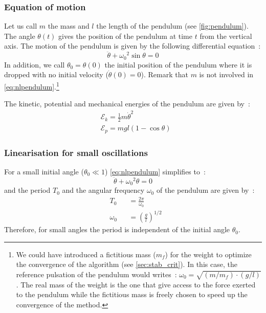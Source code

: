 \subsubsection{Equation of motion}
Let us call $m$ the mass and $l$ the length of the pendulum (see \cref{fig:pendulum}). The angle $\theta(t)$ gives the position of the pendulum at time $t$ from the vertical axis. The motion of the pendulum is given by the following differential equation~:
\begin{equation}
	\ddot{\theta} + {\omega_0}^2 \sin{\theta} = 0 \label{eq:nlpendulum}
\end{equation}
In addition, we call $\theta_0 = \theta(0)$ the initial position of the pendulum where it is dropped with no initial velocity ($\dot{\theta}(0) = 0$). Remark that $m$ is not involved in \cref{eq:nlpendulum}.\footnote{We could have introduced a fictitious mass ($m_f$) for the weight to optimize the convergence of the algorithm (see \cref{sec:stab_crit}). In this case, the reference pulsation of the pendulum would writes~: $\omega_0 = \sqrt{(m/m_f)\cdot(g/l)}$. The real mass of the weight is the one that give access to the force exerted to the pendulum while the fictitious mass is freely chosen to speed up the convergence of the method.}

The kinetic, potential and mechanical energies of the pendulum are given by~:
\begin{subequations}
\begin{alignat}{5}	
	&\mathcal{E}_k = \frac{1}{2} m \dot{\theta}^2 
	\\
	&\mathcal{E}_p =  mgl (1-\cos\theta) 
\end{alignat}
\end{subequations}
\subsubsection{Linearisation for small oscillations}
For a small initial angle ($\theta_0 \ll 1$) \cref{eq:nlpendulum} simplifies to~:
\begin{equation}
	\ddot{\theta} + {\omega_0}^2 {\theta} = 0 \label{eq:lpendulum}
\end{equation}
and the period $T_0$ and the angular frequency $\omega_0$ of the pendulum are given by~:
\begin{subequations}
\begin{alignat}{5}	
	&{T_0} &&= \frac{2\pi}{\omega_0}\\[0.5em]
	&{\omega_0} &&= \left({\frac{g}{l}}\right)^{1/2}
\end{alignat}
\end{subequations}
Therefore, for small angles the period is independent of the initial angle $\theta_0$.

